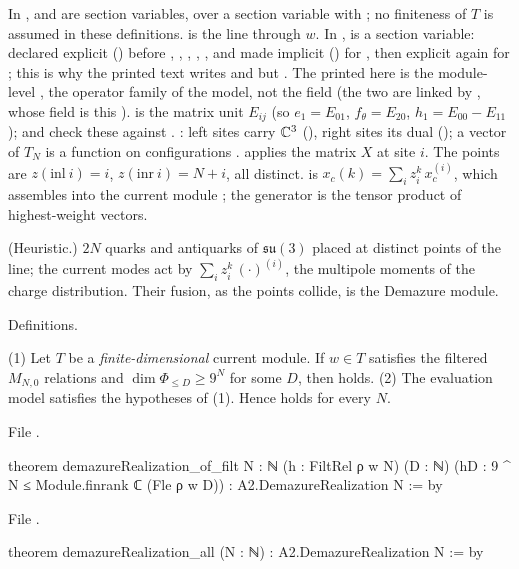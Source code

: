 \begin{dictionary}
In ,  and  are section variables, over a section variable
 with \lean{[AddCommGroup T] [Module ℂ T]}; no finiteness of $T$ is assumed in these definitions.  is
the line through $w$. In ,  is a section variable: declared explicit
() before , , , , , and made implicit ()
for , then explicit again for ; this is why the printed text writes  and  but
. The  printed here is the module-level , the operator family of the model, not the field
 (the two are linked by , whose  field is this ).
 is the matrix unit $E_{ij}$ (so $e_1=E_{01}$, $f_\theta=E_{20}$, $h_1=E_{00}-E_{11}$);
 and  check these against . : left sites
carry ${\mathbb{C}}^3$ (), right sites its dual (); a vector of $T_N$ is a function on
configurations .  applies the matrix $X$ at site $i$. The points are $z(\mathrm{inl}\ i)=i$,
$z(\mathrm{inr}\ i)=N+i$, all distinct.  is $x_c(k)=\sum_iz_i^k\,x_c^{(i)}$, which assembles into the
current module ; the generator  is the tensor product of highest-weight vectors.
\end{dictionary}

\begin{physics}
(Heuristic.) $2N$ quarks and antiquarks of $\mathfrak{su}(3)$ placed at distinct points of the line; the current modes act by
$\sum_iz_i^k\,(\cdot)^{(i)}$, the multipole moments of the charge distribution. Their fusion, as the points collide, is the
Demazure module.
\end{physics}

\begin{status}
Definitions.
\end{status}

\begin{theorem}[U7 for $A_2$]\label{l26:thm:u7}
(1) Let $T$ be a \emph{finite-dimensional} current module. If $w\in T$ satisfies the filtered $M_{N,0}$ relations and
$\dim\Phi_{\le D}\ge9^N$ for some $D$, then  holds. (2) The evaluation model satisfies the hypotheses of (1). Hence
 holds for every $N$.
\end{theorem}
\noindent File .
\begin{leancode}
theorem demazureRealization_of_filt {N : ℕ} (h : FiltRel ρ w N) (D : ℕ)
    (hD : 9 ^ N ≤ Module.finrank ℂ (Fle ρ w D)) : A2.DemazureRealization N := by
\end{leancode}
\noindent File .
\begin{leancode}
theorem demazureRealization_all (N : ℕ) : A2.DemazureRealization N := by
\end{leancode}

